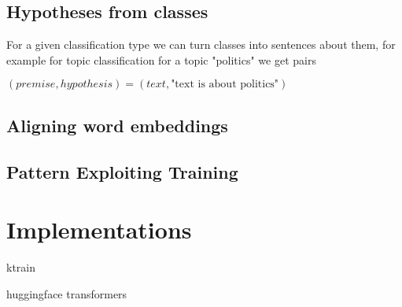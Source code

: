 \documentclass[11pt]{article}
\begin{document}
\subsection{Hypotheses from classes}
For a given classification type we can turn classes into sentences about them, for example for topic classification for a topic "politics" we get pairs

$(premise, hypothesis) = (text, \textrm{"text\ is\ about\ politics"})$


\subsection{Aligning word embeddings}

\subsection{Pattern Exploiting Training}

\section{Implementations}
ktrain

huggingface transformers
\end{document}

